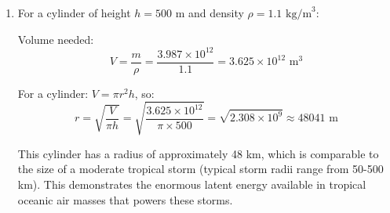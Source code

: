 \documentclass[letterpaper, 11pt]{article}
\newcommand{\1}{\mathds{1}}	%
\theoremstyle{definition}
\begin{document}
\begin{enumerate}[label=(\alph*)]
    \item For a cylinder of height $h = 500\text{ m}$ and density $\rho = 1.1\text{ kg/m}^3$:
    
    Volume needed:
    \begin{equation*}
    V = \frac{m}{\rho} = \frac{3.987 \times 10^{12}}{1.1} = 3.625\times 10^{12}\text{ m}^3
    \end{equation*}
    
    For a cylinder: $V = \pi r^2 h$, so:
    \begin{equation*}
    r = \sqrt{\frac{V}{\pi h}} = \sqrt{\frac{3.625\times 10^{12}}{\pi \times 500}} = \sqrt{2.308 \times 10^9} \approx 48041\text{ m} 
    \end{equation*}
    
    This cylinder has a radius of approximately 48 km, which is comparable to the size of a moderate tropical storm (typical storm radii range from 50-500 km). This demonstrates the enormous latent energy available in tropical oceanic air masses that powers these storms.
\end{enumerate}
\end{document}
